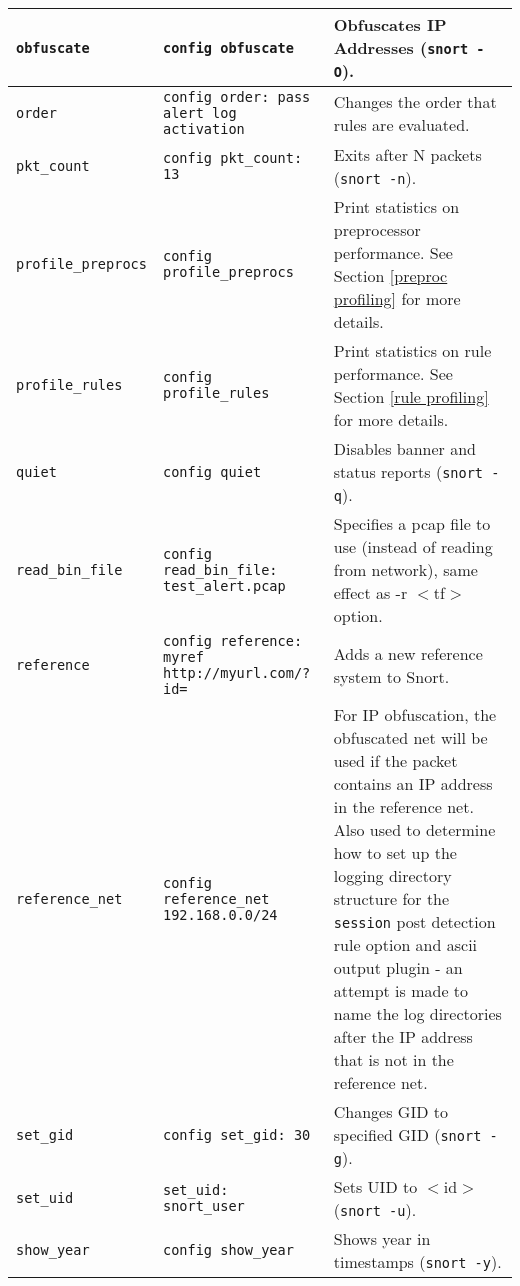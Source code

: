 \documentclass[english]{report}
\begin{document}
\begin{center}
\begin{longtable}{| p{2in} | p{2.25in} | p{2.25in} |}
\hline
\texttt{obfuscate} & \texttt{config obfuscate} & Obfuscates IP Addresses (\texttt{snort -O}). \\
\hline
\texttt{order} & \texttt{config order: pass alert log activation} & Changes the order that rules are evaluated. \\
\hline
\texttt{pkt\_count} & \texttt{config pkt\_count: 13} & Exits after N packets (\texttt{snort -n}). \\
\hline
\texttt{profile\_preprocs} & \texttt{config profile\_preprocs} & Print statistics on preprocessor performance.
See Section \ref{preproc profiling} for more details. \\

\hline
\texttt{profile\_rules} & \texttt{config profile\_rules} & Print statistics on rule performance.
See Section \ref{rule profiling} for more details. \\
\hline
\texttt{quiet} & \texttt{config quiet}& Disables banner and status reports (\texttt{snort -q}). \\
\hline
\texttt{read\_bin\_file} & \texttt{config read\_bin\_file: test\_alert.pcap} & Specifies a pcap file to use 
(instead of reading from network),
        same effect as -r $<$tf$>$ option.\\
\hline
\texttt{reference} & \texttt{config reference: myref http://myurl.com/?id=} & Adds a new reference system to Snort.  \\
\hline
\texttt{reference\_net} & \texttt{config reference\_net 192.168.0.0/24} & For IP obfuscation, the obfuscated net will be used if the packet contains an IP address in the reference net.  Also used to determine how to set up the logging directory structure for the \texttt{session} post detection rule option and ascii output plugin - an attempt is made to name the log directories after the IP address that is not in the reference net. \\
\hline
\texttt{set\_gid} & \texttt{config set\_gid: 30} & Changes GID to specified GID (\texttt{snort -g}). \\
\hline
\texttt{set\_uid} & \texttt{set\_uid: snort\_user} & Sets UID to $<$id$>$ (\texttt{snort -u}). \\
\hline
\texttt{show\_year} & \texttt{config show\_year} & Shows year in timestamps (\texttt{snort -y}). \\

\end{longtable}
\end{center}
\end{document}
